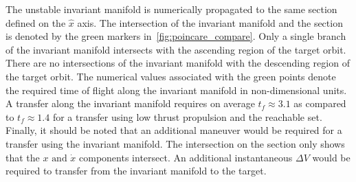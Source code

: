 The unstable invariant manifold is numerically propagated to the same \Poincare section defined on the \( \hat{x} \) axis.
The intersection of the invariant manifold and the \Poincare section is denoted by the green markers in~\cref{fig:poincare_compare}.
Only a single branch of the invariant manifold intersects with the ascending region of the target orbit.
There are no intersections of the invariant manifold with the descending region of the target orbit.
The numerical values associated with the green points denote the required time of flight along the invariant manifold in non-dimensional units.
A transfer along the invariant manifold requires on average \( t_f \approx 3.1 \) as compared to \( t_f \approx 1.4 \) for a transfer using low thrust propulsion and the reachable set.
Finally, it should be noted that an additional maneuver would be required for a transfer using the invariant manifold.
The intersection on the \Poincare section only shows that the \( x \text{ and } \dot{x} \) components intersect.
An additional instantaneous \( \Delta V \) would be required to transfer from the invariant manifold to the target.

